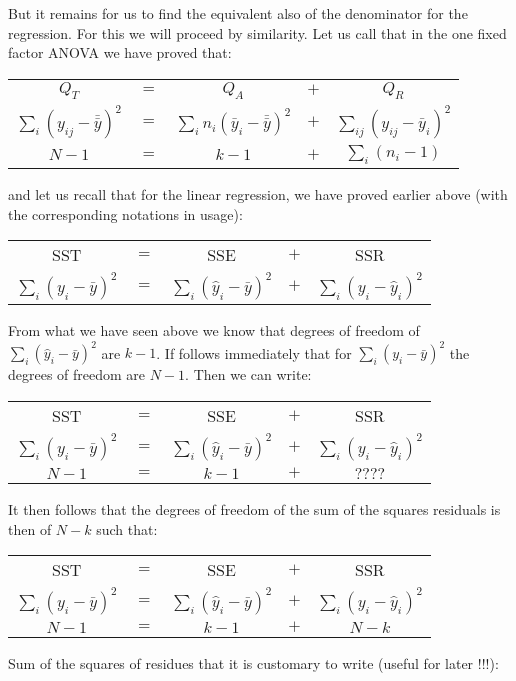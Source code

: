 	But it remains for us to find the equivalent also of the denominator for the regression. For this we will proceed by similarity. Let us call that in the one fixed factor ANOVA we have proved that:
	\begin{table}[H]
		\centering
		\begin{tabular}{ccccc}
		$Q_T$ & $=$ & $Q_A$ & $+$ & $Q_R$  \\
		$\displaystyle\sum_i (y_{ij}-\bar{\bar{y}})^2$ & $=$ & $\displaystyle\sum_i n_i(\bar{y}_i-\bar{\bar{y}})^2$ & $+$  & $\displaystyle\sum_{ij}(y_{ij}-\bar{y}_i)^2$  \\
		 $N-1$ & $=$ & $k-1$ & $+$ & $\displaystyle\sum_i (n_i-1)$  \\
		\end{tabular}
	\end{table}
	and let us recall that for the linear regression, we have proved earlier above (with the corresponding notations in usage):
	\begin{table}[H]
		\centering
		\begin{tabular}{ccccc}
		SST & $=$ & SSE & $+$ & SSR  \\
		$\displaystyle\sum_i (y_{i}-\bar{y})^2$ & $=$ & $\displaystyle\sum_i (\hat{y}_i-\bar{y})^2$ & $+$  & $\displaystyle\sum_i(y_i-\hat{y}_i)^2$  \\
		\end{tabular}
	\end{table}
	From what we have seen above we know that degrees of freedom of $\sum_i (\hat{y}_i-\bar{y})^2$ are $k-1$. If follows immediately that for $\sum_i (y_{i}-\bar{y})^2$ the degrees of freedom are $N-1$. Then we can write:
	\begin{table}[H]
		\centering
		\begin{tabular}{ccccc}
		SST & $=$ & SSE & $+$ & SSR  \\
		$\displaystyle\sum_i (y_{i}-\bar{y})^2$ & $=$ & $\displaystyle\sum_i (\hat{y}_i-\bar{y})^2$ & $+$  & $\displaystyle\sum_i(y_i-\hat{y}_i)^2$  \\
		$N-1$ & $=$ & $k-1$ & $+$ & $????$  \\
		\end{tabular}
	\end{table}
	It then follows that the degrees of freedom of the sum of the squares residuals is then of $N-k$ such that:
	\begin{table}[H]
		\centering
		\begin{tabular}{ccccc}
		SST & $=$ & SSE & $+$ & SSR  \\
		$\displaystyle\sum_i (y_{i}-\bar{y})^2$ & $=$ & $\displaystyle\sum_i (\hat{y}_i-\bar{y})^2$ & $+$  & $\displaystyle\sum_i(y_i-\hat{y}_i)^2$  \\
		$N-1$ & $=$ & $k-1$ & $+$ & $N-k$  \\
		\end{tabular}
	\end{table}
	Sum of the squares of residues that it is customary to write (useful for later !!!):
	
